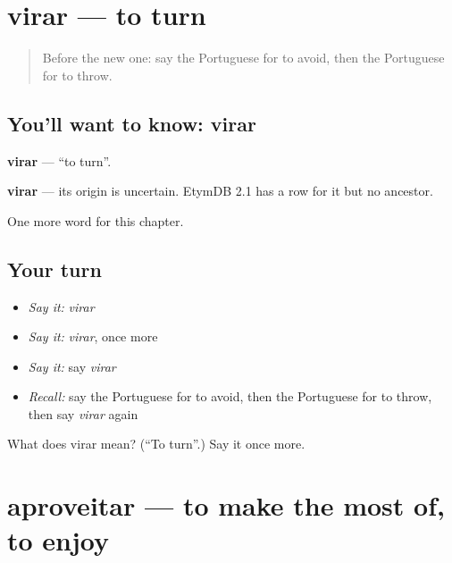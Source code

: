 \section[virar]{virar — to turn}

\label{lesson:PT-C142-virar}



\begin{quote}
Before the new one: say the Portuguese for to avoid, then the Portuguese for to throw.
\end{quote}

\subsection*{You'll want to know: virar}
\textbf{virar} — \textquotedblleft{}to turn\textquotedblright{}.

\begin{cousinweb}
\textbf{virar} — its origin is uncertain. EtymDB 2.1 has a row for it but no ancestor.
\end{cousinweb}

\begin{grammarlens}[title={What you've built}]
One more word for this chapter.
\end{grammarlens}

\subsection*{Your turn}
\begin{itemize}
\raggedright
  \item \emph{Say it:} \emph{virar}
  \item \emph{Say it:} \emph{virar}, once more
  \item \emph{Say it:} say \emph{virar}
  \item \emph{Recall:} say the Portuguese for to avoid, then the Portuguese for to throw, then say \emph{virar} again
\end{itemize}

\begin{tcolorbox}[breakable,colback=teal!4,colframe=teal!35!black,title={Before you move on}]
What does virar mean? (\textquotedblleft{}To turn\textquotedblright{}.) Say it once more.
\end{tcolorbox}
\section[aproveitar]{aproveitar — to make the most of, to enjoy}

